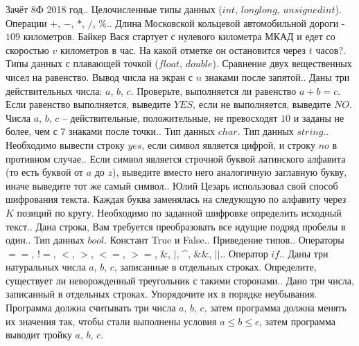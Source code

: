 \documentclass[a4paper,12pt]{article}
\begin{document}
Зачёт 8Ф 2018 год.. Целочисленные типы данных ($int$, $long long$, $unsigned int$). Операции $+$, $-$, $*$, $/$, $\%$.. Длина Московской кольцевой автомобильной дороги - $109$ километров. Байкер Вася стартует с нулевого километра МКАД и едет со скоростью $v$ километров в час. На какой отметке он остановится через $t$ часов?. Типы данных с плавающей точкой ($float$, $double$). Сравнение двух вещественных чисел на равенство. Вывод числа на экран с $n$ знаками после запятой.. Даны три действительных числа: $a$, $b$, $c$. Проверьте, выполняется ли равенство $a + b = c$. Если равенство выполняется, выведите $YES$, если не выполняется, выведите $NO$. Числа $a$, $b$, $c$ –  действительные, положительные, не превосходят $10$ и заданы не более, чем с $7$ знаками после точки.. Тип данных $char$. Тип данных $string$.. Необходимо вывести  строку $yes$, если символ является цифрой, и строку $no$ в противном случае.. Если символ является строчной буквой латинского алфавита (то есть буквой от $a$ до $z$), выведите вместо него аналогичную заглавную букву, иначе выведите тот же самый символ.. Юлий Цезарь использовал свой способ шифрования текста. Каждая буква заменялась на следующую по алфавиту через $K$ позиций по кругу. Необходимо по заданной шифровке определить исходный текст.. Дана строка, Вам требуется преобразовать все идущие подряд пробелы в один.. Тип данных $bool$. Констант True и False.. Приведение типов.. Операторы $==$, $!=$, $<$, $>$, $<=$, $>=$, $\&$, $|$, \textasciicircum, $\&\&$, $||$.. Оператор $if$.. Даны три натуральных числа $a$, $b$, $c$, записанные в отдельных строках. Определите, существует ли неворожденный треугольник с такими сторонами.. Дано три числа, записанный в отдельных строках. Упорядочите их в порядке неубывания. Программа должна считывать три числа $a$, $b$, $c$, затем программа должна менять их значения так, чтобы стали выполнены условия $a \le b \le c$, затем программа выводит тройку $a$, $b$, $c$.\newline
\end{document}
